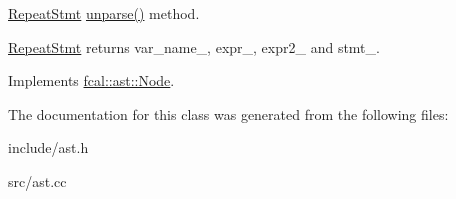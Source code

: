 \hyperlink{classfcal_1_1ast_1_1RepeatStmt}{Repeat\+Stmt} \hyperlink{classfcal_1_1ast_1_1RepeatStmt_a29fc58ac93a3b92cb2d5e83047f94fb6}{unparse()} method. 

\hyperlink{classfcal_1_1ast_1_1RepeatStmt}{Repeat\+Stmt} returns var\+\_\+name\+\_\+, expr\+\_\+, expr2\+\_\+ and stmt\+\_\+. 

Implements \hyperlink{classfcal_1_1ast_1_1Node_a81865f5a1df593708a39bf492952742a}{fcal\+::ast\+::\+Node}.



The documentation for this class was generated from the following files\+:\begin{DoxyCompactItemize}
\item 
include/ast.\+h\item 
src/ast.\+cc\end{DoxyCompactItemize}
